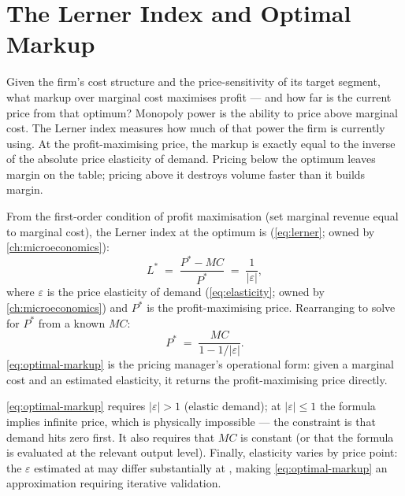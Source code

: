 \section{The Lerner Index and Optimal Markup}\label{sec:optimal-markup}

Given the firm's cost structure and the price-sensitivity of its target segment, what markup over marginal cost maximises profit --- and how far is the current price from that optimum? Monopoly power is the ability to price above marginal cost. The Lerner index measures how much of that power the firm is currently using. At the profit-maximising price, the markup is exactly equal to the inverse of the absolute price elasticity of demand. Pricing below the optimum leaves margin on the table; pricing above it destroys volume faster than it builds margin.

From the first-order condition of profit maximisation (set marginal revenue equal to marginal cost), the Lerner index at the optimum is (\cref{eq:lerner}; owned by \cref{ch:microeconomics}):
\begin{equation*}
  L^* \;=\; \frac{P^* - MC}{P^*} \;=\; \frac{1}{|\varepsilon|} ,
\end{equation*}
where \(\varepsilon\) is the price elasticity of demand (\cref{eq:elasticity}; owned by \cref{ch:microeconomics}) and \(P^*\) is the profit-maximising price. Rearranging to solve for \(P^*\) from a known \(MC\):
\begin{equation}\label{eq:optimal-markup}
  P^* \;=\; \frac{MC}{1 - 1/|\varepsilon|} .
\end{equation}
\cref{eq:optimal-markup} is the pricing manager's operational form: given a marginal cost and an estimated elasticity, it returns the profit-maximising price directly.

\cref{eq:optimal-markup} requires \(|\varepsilon| > 1\) (elastic demand); at \(|\varepsilon| \le 1\) the formula implies infinite price, which is physically impossible --- the constraint is that demand hits zero first. It also requires that \(MC\) is constant (or that the formula is evaluated at the relevant output level). Finally, elasticity varies by price point: the \(\varepsilon\) estimated at  may differ substantially at , making \cref{eq:optimal-markup} an approximation requiring iterative validation.

